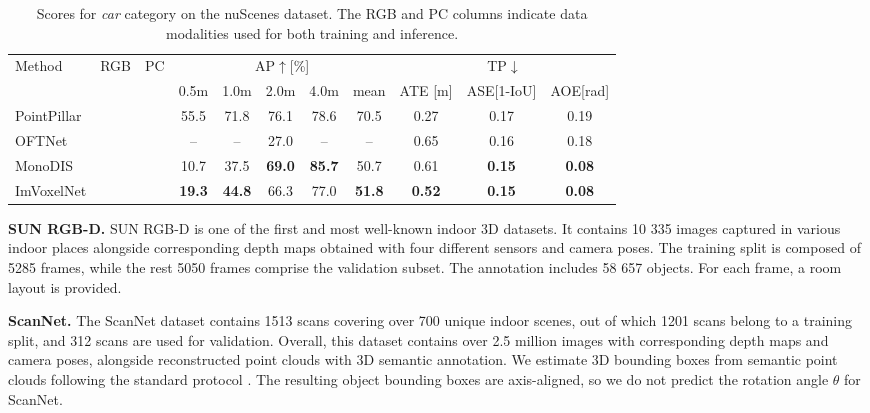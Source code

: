 \documentclass[10pt,twocolumn,letterpaper]{article}
\newcommand{\cmark}{\ding{51}}
\newcommand{\xmark}{\ding{55}}
\begin{document}
\begin{table*}[ht!]
    \centering \small
    \begingroup \setlength{\tabcolsep}{2pt}
    \begin{tabular}{l|cc|ccccc|ccc}
        \hline
        \multirow[c]{2}{*}{Method} & \multirow[c]{2}{*}{RGB}  & \multirow[c]{2}{*}{PC} & \multicolumn{5}{c|}{AP$\uparrow$[\%]} & \multicolumn{3}{c}{TP$\downarrow$} \\
        & & & 0.5m & 1.0m & 2.0m & 4.0m & mean & ATE [m] & ASE[1-IoU] & AOE[rad] \\ \hline
        PointPillar\cite{lang2019pointpillars} & \xmark & \cmark & 55.5 & 71.8 & 76.1 & 78.6 & 70.5 & 0.27 & 0.17 & 0.19 \\ \hline
        OFTNet \cite{roddick2018orthographic, simonelli2020disentangling} & \cmark & \xmark & -- & -- & 27.0 & -- & -- & 0.65 & 0.16 & 0.18 \\
        MonoDIS \cite{simonelli2020disentangling} & \cmark & \xmark & 10.7 & 37.5 & \textbf{69.0} & \textbf{85.7} & 50.7 & 0.61 & \textbf{0.15} & \textbf{0.08} \\
        ImVoxelNet & \cmark & \xmark & \textbf{19.3} & \textbf{44.8} & 66.3 & 77.0 & \textbf{51.8} & \textbf{0.52} & \textbf{0.15} & \textbf{0.08} \\ \hline
    \end{tabular} \endgroup
    \caption{Scores for \textit{car} category on the nuScenes dataset. The RGB and PC columns indicate data modalities used for both training and inference.}
    \label{tab:nuscenes}
\end{table*}

\textbf{SUN RGB-D.} SUN RGB-D \cite{song2015sunrgbd} is one of the first and most well-known indoor 3D datasets. It contains 10 335 images captured in various indoor places alongside corresponding depth maps obtained with four different sensors and camera poses. The training split is composed of 5285 frames, while the rest 5050 frames comprise the validation subset. The annotation includes 58 657 objects. For each frame, a room layout is provided.

\textbf{ScanNet.} The ScanNet dataset \cite{dai2017scannet} contains 1513 scans covering over 700 unique indoor scenes, out of which 1201 scans belong to a training split, and 312 scans are used for validation. Overall, this dataset contains over 2.5 million images with corresponding depth maps and camera poses, alongside reconstructed point clouds with 3D semantic annotation. We estimate 3D bounding boxes from semantic point clouds following the standard protocol \cite{qi2019votenet}. The resulting object bounding boxes are axis-aligned, so we do not predict the rotation angle $\theta$ for ScanNet.
\end{document}
